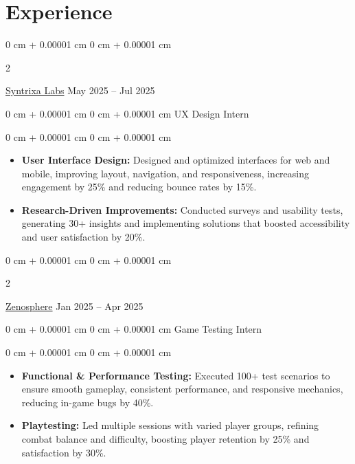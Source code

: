 \documentclass[10pt, letterpaper]{article}
\newenvironment{highlights}{
   \begin{itemize}[
        topsep=0.10 cm,
        parsep=0.10 cm,
        partopsep=0pt,
        itemsep=0pt
    ]
    \addtolength{\leftskip}{-0.5em} %
}{
    \end{itemize}
} %
\newenvironment{onecolentry}{
    \begin{adjustwidth}{
        0 cm + 0.00001 cm
    }{
        0 cm + 0.00001 cm
    }
}{
    \end{adjustwidth}
} %
\newenvironment{twocolentry}[2][]{
    \onecolentry
    \def\secondColumn{#2}
    \setcolumnwidth{\fill, 4.5 cm}
    \begin{paracol}{2}
}{
    \switchcolumn \raggedleft \secondColumn
    \end{paracol}
    \endonecolentry
} %
\begin{document}
    
    \section{\color{secondaryColor}Experience}
        
        \begin{twocolentry}{
            May 2025 – Jul 2025
        }
            \href{https://drive.google.com/file/d/1Jw04SeUUkmPlVVlDZGhJYa0hS0fV_p2_/view}{Syntrixa Labs}\end{twocolentry}
            \begin{onecolentry}UX Design Intern\end{onecolentry}

        \vspace{0.10 cm}
        \begin{onecolentry}
            \begin{highlights}
                \item \textbf{User Interface Design:} Designed and optimized interfaces for web and mobile, improving layout, navigation, and responsiveness, increasing engagement by 25\% and reducing bounce rates by 15\%.
                \item \textbf{Research-Driven Improvements:} Conducted surveys and usability tests, generating 30+ insights and implementing solutions that boosted accessibility and user satisfaction by 20\%.
            \end{highlights}
        \end{onecolentry}

        \vspace{0.2 cm}

        \begin{twocolentry}{
            Jan 2025 – Apr 2025
        }
            \href{https://drive.google.com/file/d/1tdZKt4EahYNGUoKIpC7yJ9_j8B5GTOyI/view}{Zenosphere}\end{twocolentry}
            \begin{onecolentry}Game Testing Intern\end{onecolentry}

        \vspace{0.10 cm}
        \begin{onecolentry}
            \begin{highlights}
                \item \textbf{Functional \& Performance Testing:} Executed 100+ test scenarios to ensure smooth gameplay, consistent performance, and responsive mechanics, reducing in-game bugs by 40\%.
                \item \textbf{Playtesting:} Led multiple sessions with varied player groups, refining combat balance and difficulty, boosting player retention by 25\% and satisfaction by 30\%.
                
            \end{highlights}
        \end{onecolentry}
    
\end{document}
